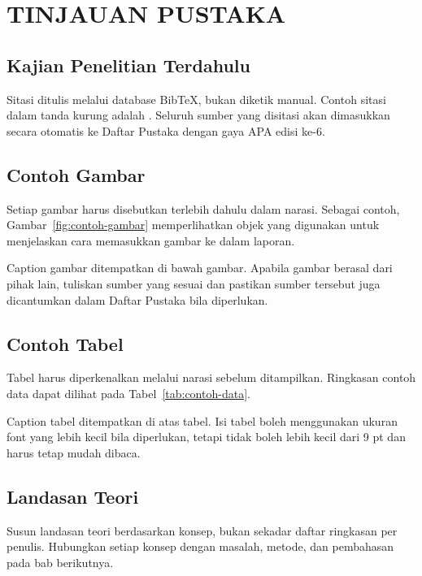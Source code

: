 \chapter{TINJAUAN PUSTAKA}


\section{Kajian Penelitian Terdahulu}

Sitasi ditulis melalui database BibTeX, bukan diketik manual. Contoh sitasi dalam tanda kurung adalah \cite{lamport1994}. Seluruh sumber yang disitasi akan dimasukkan secara otomatis ke Daftar Pustaka dengan gaya APA edisi ke-6.

\section{Contoh Gambar}

Setiap gambar harus disebutkan terlebih dahulu dalam narasi. Sebagai contoh, Gambar~\ref{fig:contoh-gambar} memperlihatkan objek yang digunakan untuk menjelaskan cara memasukkan gambar ke dalam laporan.



Caption gambar ditempatkan di bawah gambar. Apabila gambar berasal dari pihak lain, tuliskan sumber yang sesuai dan pastikan sumber tersebut juga dicantumkan dalam Daftar Pustaka bila diperlukan.

\section{Contoh Tabel}

Tabel harus diperkenalkan melalui narasi sebelum ditampilkan. Ringkasan contoh data dapat dilihat pada Tabel~\ref{tab:contoh-data}.



Caption tabel ditempatkan di atas tabel. Isi tabel boleh menggunakan ukuran font yang lebih kecil bila diperlukan, tetapi tidak boleh lebih kecil dari 9 pt dan harus tetap mudah dibaca.

\section{Landasan Teori}

Susun landasan teori berdasarkan konsep, bukan sekadar daftar ringkasan per penulis. Hubungkan setiap konsep dengan masalah, metode, dan pembahasan pada bab berikutnya.
